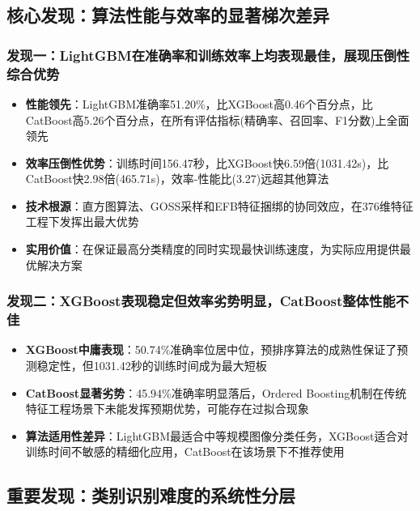 \documentclass[UTF8]{report}
\theoremstyle{MyLineTheoremStyle} %
\theoremstyle{MyBlockTheoremStyle} %
\theoremstyle{MySubsubsectionStyle} %
\begin{document}
\subsection{核心发现：算法性能与效率的显著梯次差异}
\subsubsection{发现一：LightGBM在准确率和训练效率上均表现最佳，展现压倒性综合优势}
\begin{itemize}
    \item \textbf{性能领先}：LightGBM准确率51.20\%，比XGBoost高0.46个百分点，比CatBoost高5.26个百分点，在所有评估指标(精确率、召回率、F1分数)上全面领先
    \item \textbf{效率压倒性优势}：训练时间156.47秒，比XGBoost快6.59倍(1031.42s)，比CatBoost快2.98倍(465.71s)，效率-性能比(3.27)远超其他算法
    \item \textbf{技术根源}：直方图算法、GOSS采样和EFB特征捆绑的协同效应，在376维特征工程下发挥出最大优势
    \item \textbf{实用价值}：在保证最高分类精度的同时实现最快训练速度，为实际应用提供最优解决方案
\end{itemize}

\subsubsection{发现二：XGBoost表现稳定但效率劣势明显，CatBoost整体性能不佳}
\begin{itemize}
    \item \textbf{XGBoost中庸表现}：50.74\%准确率位居中位，预排序算法的成熟性保证了预测稳定性，但1031.42秒的训练时间成为最大短板
    \item \textbf{CatBoost显著劣势}：45.94\%准确率明显落后，Ordered Boosting机制在传统特征工程场景下未能发挥预期优势，可能存在过拟合现象
    \item \textbf{算法适用性差异}：LightGBM最适合中等规模图像分类任务，XGBoost适合对训练时间不敏感的精细化应用，CatBoost在该场景下不推荐使用
\end{itemize}

\subsection{重要发现：类别识别难度的系统性分层}
\end{document}
